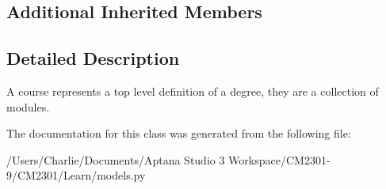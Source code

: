 \subsection*{Additional Inherited Members}


\subsection{Detailed Description}
A course represents a top level definition of a degree, they are a collection of modules. 

The documentation for this class was generated from the following file\-:\begin{DoxyCompactItemize}
\item 
/\-Users/\-Charlie/\-Documents/\-Aptana Studio 3 Workspace/\-C\-M2301-\/9/\-C\-M2301/\-Learn/models.\-py\end{DoxyCompactItemize}
